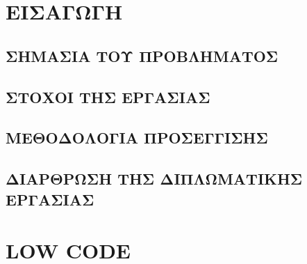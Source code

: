 \documentclass{TEMPLATE}
\begin{document}
	
	\mainmatter

    \chapter{ΕΙΣΑΓΩΓΗ}

        \section{ΣΗΜΑΣΙΑ ΤΟΥ ΠΡΟΒΛΗΜΑΤΟΣ}
        \section{ΣΤΟΧΟΙ ΤΗΣ ΕΡΓΑΣΙΑΣ}
        \section{ΜΕΘΟΔΟΛΟΓΙΑ ΠΡΟΣΕΓΓΙΣΗΣ}
        \section{ΔΙΑΡΘΡΩΣΗ ΤΗΣ ΔΙΠΛΩΜΑΤΙΚΗΣ ΕΡΓΑΣΙΑΣ}

    \chapter{LOW CODE}




\end{document}
